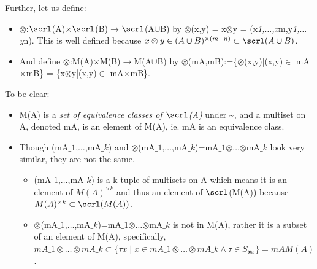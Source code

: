 \documentclass[12pt,a4paper]{article}
\begin{document}
Further, let us define:

\begin{itemize}
\item \ensuremath{\otimes}:\ensuremath{\scrl}(A)\ensuremath{\times}\ensuremath{\scrl}(B)\ensuremath{\rightarrow}\ensuremath{\scrl}(A\ensuremath{\cup}B) by \ensuremath{\otimes}(x,y) = x\ensuremath{\otimes}y = (x\emph{1,\ensuremath{\ldots},x}m,y\emph{1,\ensuremath{\ldots}y}n). This is well defined because $x\ensuremath{\otimes}y\ensuremath{\in}(A\ensuremath{\cup}B)^{\ensuremath{\times}(m+n)} \ensuremath{\subset} \ensuremath{\scrl}(A\ensuremath{\cup}B)$.


\item And define \ensuremath{\otimes}:M(A)\ensuremath{\times}M(B)\ensuremath{\rightarrow}M(A\ensuremath{\cup}B) by \ensuremath{\otimes}(mA,mB):=\{\ensuremath{\otimes}(x,y)|(x,y)\ensuremath{\in} mA\ensuremath{\times}mB\} = \{x\ensuremath{\otimes}y|(x,y)\ensuremath{\in} mA\ensuremath{\times}mB\}.

\end{itemize}

To be clear:

\begin{itemize}
\item M(A) is a \emph{set of equivalence classes of \ensuremath{\scrl}(A)} under {\textasciitilde}, and a multiset on A, denoted mA, is an element of M(A), ie. mA is an equivalence class.


\item Though (mA\ensuremath{\_1},\ensuremath{\ldots},mA\ensuremath{\_k}) and \ensuremath{\otimes}(mA\ensuremath{\_1},\ensuremath{\ldots},mA\ensuremath{\_k})=mA\ensuremath{\_1}\ensuremath{\otimes}\ensuremath{\ldots}\ensuremath{\otimes}mA\ensuremath{\_k} look very similar, they are not the same.

\begin{itemize}
\item (mA\ensuremath{\_1},\ensuremath{\ldots},mA\ensuremath{\_k}) is a k-tuple of multisets on A which means it is an element of $M(A)^{\ensuremath{\times}k}$ and thus an element of \ensuremath{\scrl}(M(A)) because $M(A)^{\ensuremath{\times}k} \ensuremath{\subset} \ensuremath{\scrl}(M(A))$.


\item \ensuremath{\otimes}(mA\ensuremath{\_1},\ensuremath{\ldots},mA\ensuremath{\_k})=mA\ensuremath{\_1}\ensuremath{\otimes}\ensuremath{\ldots}\ensuremath{\otimes}mA\ensuremath{\_k} is not in M(A), rather it is a subset of an element of M(A), specifically, $mA\ensuremath{\_1}\ensuremath{\otimes}\ensuremath{\ldots}\ensuremath{\otimes}mA\ensuremath{\_k} \ensuremath{\subset} \{ \ensuremath{\tau}x \ensuremath{\mid} x\ensuremath{\in}mA\ensuremath{\_1}\ensuremath{\otimes}\ensuremath{\ldots}\ensuremath{\otimes}mA\ensuremath{\_k} \ensuremath{\wedge} \ensuremath{\tau}\ensuremath{\in}S_{\ensuremath{\smashtimes}x} \} = mA M(A)$.

\end{itemize}
\end{itemize}
\end{document}
